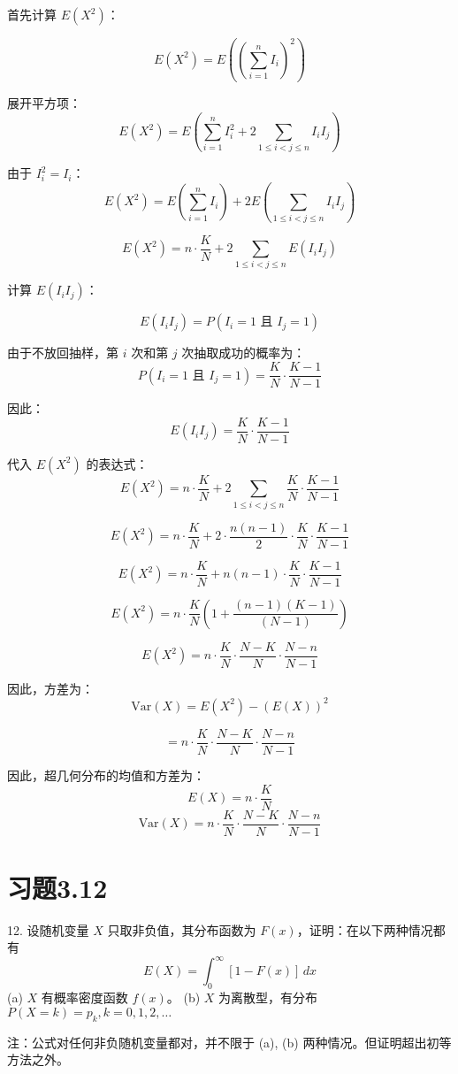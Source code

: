 \documentclass[UTF8]{report}
\theoremstyle{MyLineTheoremStyle} %
\theoremstyle{MyBlockTheoremStyle} %
\theoremstyle{MySubsubsectionStyle} %
\begin{document}
首先计算 \(E(X^2)\)：

\[
E(X^2) = E\left( \left( \sum_{i=1}^{n} I_i \right)^2 \right)
\]

展开平方项：
\[
E(X^2) = E\left( \sum_{i=1}^{n} I_i^2 + 2 \sum_{1 \leq i < j \leq n} I_i I_j \right)
\]

由于 \(I_i^2 = I_i\)：
\[
E(X^2) = E\left( \sum_{i=1}^{n} I_i \right) + 2 E\left( \sum_{1 \leq i < j \leq n} I_i I_j \right)
\]

\[
E(X^2) = n \cdot \frac{K}{N} + 2 \sum_{1 \leq i < j \leq n} E(I_i I_j)
\]

计算 \(E(I_i I_j)\)：

\[
E(I_i I_j) = P(I_i = 1 \text{ 且 } I_j = 1)
\]

由于不放回抽样，第 \(i\) 次和第 \(j\) 次抽取成功的概率为：
\[
P(I_i = 1 \text{ 且 } I_j = 1) = \frac{K}{N} \cdot \frac{K-1}{N-1}
\]

因此：
\[
E(I_i I_j) = \frac{K}{N} \cdot \frac{K-1}{N-1}
\]

代入 \(E(X^2)\) 的表达式：
\[
E(X^2) = n \cdot \frac{K}{N} + 2 \sum_{1 \leq i < j \leq n} \frac{K}{N} \cdot \frac{K-1}{N-1}
\]

\[
E(X^2) = n \cdot \frac{K}{N} + 2 \cdot \frac{n(n-1)}{2} \cdot \frac{K}{N} \cdot \frac{K-1}{N-1}
\]

\[
E(X^2) = n \cdot \frac{K}{N} + n(n-1) \cdot \frac{K}{N} \cdot \frac{K-1}{N-1}
\]

\[
E(X^2) = n \cdot \frac{K}{N} \left( 1 + \frac{(n-1)(K-1)}{(N-1)} \right)
\]

\[
E(X^2) = n \cdot \frac{K}{N} \cdot \frac{N-K}{N} \cdot \frac{N-n}{N-1}
\]

因此，方差为：
\[
\text{Var}(X) = E(X^2) - (E(X))^2
\]

\[
= n \cdot \frac{K}{N} \cdot \frac{N-K}{N} \cdot \frac{N-n}{N-1}
\]

因此，超几何分布的均值和方差为：
\[
E(X) = n \cdot \frac{K}{N}
\]
\[
\text{Var}(X) = n \cdot \frac{K}{N} \cdot \frac{N-K}{N} \cdot \frac{N-n}{N-1}
\]

\section{习题3.12}

12. 设随机变量 \(X\) 只取非负值，其分布函数为 \(F(x)\)，证明：在以下两种情况都有
\[ E(X) = \int_{0}^{\infty} [1 - F(x)] \, dx \]
(a) \(X\) 有概率密度函数 \(f(x)\)。  
(b) \(X\) 为离散型，有分布 \(P(X=k)=p_k, k=0,1,2,\ldots\)

注：公式对任何非负随机变量都对，并不限于 (a), (b) 两种情况。但证明超出初等方法之外。
\end{document}
